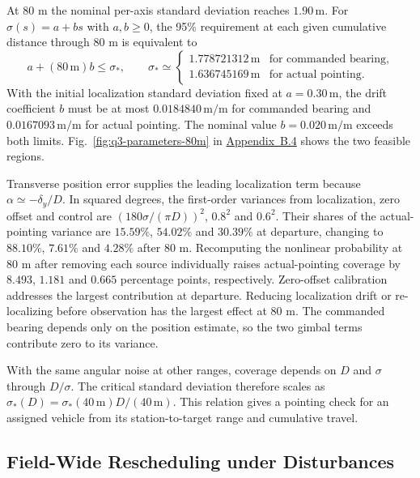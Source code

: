 \documentclass{swmcmthesis}
\begin{document}
At 80 m the nominal per-axis standard deviation reaches \(1.90\,\mathrm m\). For \(\sigma(s)=a+bs\) with \(a,b\ge0\), the 95\% requirement at each given cumulative distance through 80 m is equivalent to
\begin{equation}
\label{eq:q3-parameter-domain}
a+(80\,\mathrm m)b\le\sigma_*,\qquad
\sigma_*\simeq\begin{cases}
1.778721312\,\mathrm m & \text{for commanded bearing},\\
1.636745169\,\mathrm m & \text{for actual pointing}.
\end{cases}
\end{equation}
With the initial localization standard deviation fixed at \(a=0.30\,\mathrm m\), the drift coefficient \(b\) must be at most \(0.0184840\,\mathrm{m/m}\) for commanded bearing and \(0.0167093\,\mathrm{m/m}\) for actual pointing. The nominal value \(b=0.020\,\mathrm{m/m}\) exceeds both limits. Fig.~\ref{fig:q3-parameters-80m} in \hyperref[app:q3-alternatives]{Appendix~B.4} shows the two feasible regions.

Transverse position error supplies the leading localization term because \(\alpha\simeq-\delta_y/D\). In squared degrees, the first-order variances from localization, zero offset and control are \((180\sigma/(\pi D))^2\), \(0.8^2\) and \(0.6^2\). Their shares of the actual-pointing variance are \(15.59\%\), \(54.02\%\) and \(30.39\%\) at departure, changing to \(88.10\%\), \(7.61\%\) and \(4.28\%\) after 80 m. Recomputing the nonlinear probability at 80 m after removing each source individually raises actual-pointing coverage by \(8.493\), \(1.181\) and \(0.665\) percentage points, respectively. Zero-offset calibration addresses the largest contribution at departure. Reducing localization drift or re-localizing before observation has the largest effect at 80 m. The commanded bearing depends only on the position estimate, so the two gimbal terms contribute zero to its variance.

With the same angular noise at other ranges, coverage depends on \(D\) and \(\sigma\) through \(D/\sigma\). The critical standard deviation therefore scales as \(\sigma_*(D)=\sigma_*(40\,\mathrm m)D/(40\,\mathrm m)\). This relation gives a pointing check for an assigned vehicle from its station-to-target range and cumulative travel.

\subsection{Field-Wide Rescheduling under Disturbances}
\label{sec:q4-model}
\end{document}
